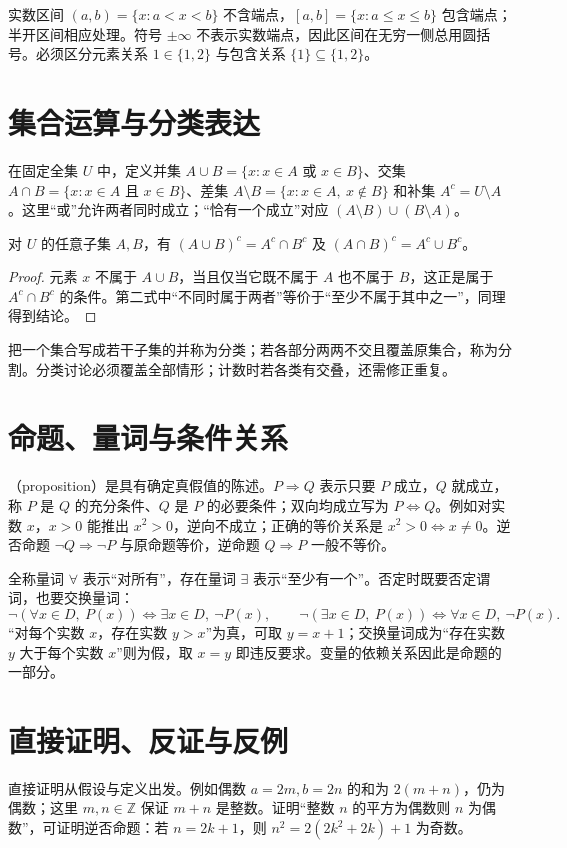 \documentclass[UTF8]{ctexbook}
\begin{document}
实数区间 $(a,b)=\{x:a<x<b\}$ 不含端点，$[a,b]=\{x:a\le x\le b\}$ 包含端点；半开区间相应处理。符号 $\pm\infty$ 不表示实数端点，因此区间在无穷一侧总用圆括号。必须区分元素关系 $1\in\{1,2\}$ 与包含关系 $\{1\}\subseteq\{1,2\}$。

\section{集合运算与分类表达}
在固定全集 $U$ 中，定义并集 $A\cup B=\{x:x\in A\text{ 或 }x\in B\}$、交集 $A\cap B=\{x:x\in A\text{ 且 }x\in B\}$、差集 $A\setminus B=\{x:x\in A,\ x\notin B\}$ 和补集 $A^c=U\setminus A$。这里“或”允许两者同时成立；“恰有一个成立”对应 $(A\setminus B)\cup(B\setminus A)$。

\begin{proposition}[德摩根律]
对 $U$ 的任意子集 $A,B$，有 $(A\cup B)^c=A^c\cap B^c$ 及 $(A\cap B)^c=A^c\cup B^c$。
\end{proposition}
\begin{proof}
元素 $x$ 不属于 $A\cup B$，当且仅当它既不属于 $A$ 也不属于 $B$，这正是属于 $A^c\cap B^c$ 的条件。第二式中“不同时属于两者”等价于“至少不属于其中之一”，同理得到结论。
\end{proof}
把一个集合写成若干子集的并称为分类；若各部分两两不交且覆盖原集合，称为分割。分类讨论必须覆盖全部情形；计数时若各类有交叠，还需修正重复。

\section{命题、量词与条件关系}
（proposition）是具有确定真假值的陈述。$P\Rightarrow Q$ 表示只要 $P$ 成立，$Q$ 就成立，称 $P$ 是 $Q$ 的充分条件、$Q$ 是 $P$ 的必要条件；双向均成立写为 $P\Leftrightarrow Q$。例如对实数 $x$，$x>0$ 能推出 $x^2>0$，逆向不成立；正确的等价关系是 $x^2>0\Leftrightarrow x\ne0$。逆否命题 $\neg Q\Rightarrow\neg P$ 与原命题等价，逆命题 $Q\Rightarrow P$ 一般不等价。

全称量词 $\forall$ 表示“对所有”，存在量词 $\exists$ 表示“至少有一个”。否定时既要否定谓词，也要交换量词：
\[
 \neg(\forall x\in D,\ P(x))\Longleftrightarrow
 \exists x\in D,\ \neg P(x),\qquad
 \neg(\exists x\in D,\ P(x))\Longleftrightarrow
 \forall x\in D,\ \neg P(x).
\]
“对每个实数 $x$，存在实数 $y>x$”为真，可取 $y=x+1$；交换量词成为“存在实数 $y$ 大于每个实数 $x$”则为假，取 $x=y$ 即违反要求。变量的依赖关系因此是命题的一部分。

\section{直接证明、反证与反例}
直接证明从假设与定义出发。例如偶数 $a=2m,b=2n$ 的和为 $2(m+n)$，仍为偶数；这里 $m,n\in\mathbb Z$ 保证 $m+n$ 是整数。证明“整数 $n$ 的平方为偶数则 $n$ 为偶数”，可证明逆否命题：若 $n=2k+1$，则 $n^2=2(2k^2+2k)+1$ 为奇数。
\end{document}
